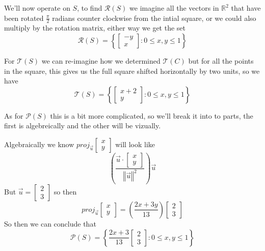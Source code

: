 \documentclass[notoc,notitlepage]{tufte-book}
\newcommand\mat[1]{\begin{bmatrix}#1\end{bmatrix}}
\begin{document}
\begin{ex}
    We'll now operate on $S$, to find $\mathcal{R}\left(S\right)$ we imagine all the vectors in $\mathbb{R}^2$ that have been rotated $\frac{\pi }{2}$ radians counter clockwise from the intial square, or we could also multiply by the rotation matrix, either way we get the set
    \begin{equation*}
        \mathcal{R}\left(S\right) = \left\{ \mat{ -y \\ x }: 0 \le x, y \le 1 \right\}
    \end{equation*}
\end{ex}

\begin{ex}
    For $\mathcal{T}\left(S\right)$ we can re-imagine how we determined $\mathcal{T}\left(C\right)$ but for all the points in the square, this gives us the full square shifted horizontally by two units, so we have
    \begin{equation*}
        \mathcal{T}\left(S\right) = \left\{ \mat{ x + 2 \\ y }: 0 \le x, y \le 1 \right\}
    \end{equation*}
\end{ex}

\begin{ex}
    As for $\mathcal{P}\left(S\right)$ this is a bit more complicated, so we'll break it into to parts, the first is algebreically and the other will be vizually.

    Algebraically we know $\mathit{proj}_{\vec{u}} {\mat{ x \\ y }} $ will look like
    \begin{equation*}
        \left( \frac{\vec{u} \cdot \mat{ x \\ y }}{\left\Vert \vec{u} \right\Vert^2} \right) \vec{u}
    \end{equation*}
    But $\vec{u} = \mat{ 2 \\ 3 }$ so then
    \begin{equation*}
        \mathit{proj}_{\vec{u}} {\mat{ x \\ y }}  = \left( \frac{2x + 3y}{13} \right) \mat{ 2 \\ 3 }
    \end{equation*}
    So then we can conclude that
    \begin{equation*}
        \mathcal{P}\left(S\right) = \left\{ \frac{2x + 3}{13} \mat{ 2 \\ 3 } : 0 \le x, y \le 1 \right\}    
    \end{equation*}
\end{ex}
\end{document}
